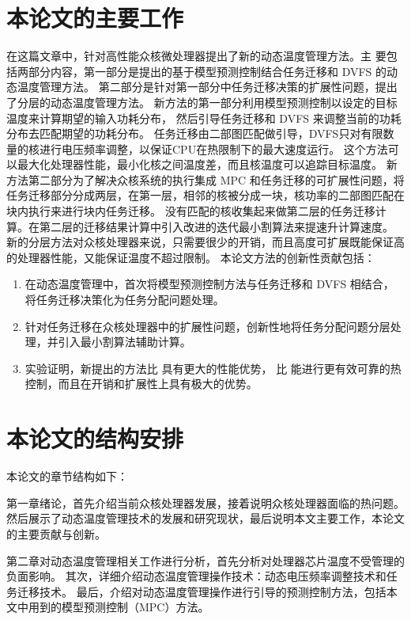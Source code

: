  \section{本论文的主要工作}\label{sec:thispaper}
在这篇文章中，针对高性能众核微处理器提出了新的动态温度管理方法。主
要包括两部分内容，第一部分是提出的基于模型预测控制结合任务迁移和 DVFS 的动态温度管理方法。
第二部分是针对第一部分中任务迁移决策的扩展性问题，提出了分层的动态温度管理方法。
新方法的第一部分利用模型预测控制以设定的目标温度来计算期望的输入功耗分布，
然后引导任务迁移和 DVFS 来调整当前的功耗分布去匹配期望的功耗分布。
任务迁移由二部图匹配做引导，DVFS只对有限数量的核进行电压频率调整，以保证CPU在热限制下的最大速度运行。
这个方法可以最大化处理器性能，最小化核之间温度差，而且核温度可以追踪目标温度。
新方法第二部分为了解决众核系统的执行集成 MPC 和任务迁移的可扩展性问题，将任务迁移部分分成两层，在第一层，相邻的核被分成一块，核功率的二部图匹配在块内执行来进行块内任务迁移。
没有匹配的核收集起来做第二层的任务迁移计算。在第二层的迁移结果计算中引入改进的迭代最小割算法来提速升计算速度。
新的分层方法对众核处理器来说，只需要很少的开销，而且高度可扩展既能保证高的处理器性能，又能保证温度不超过限制。
本论文方法的创新性贡献包括：
\begin{enumerate}
\item 在动态温度管理中，首次将模型预测控制方法与任务迁移和 DVFS 相结合，将任务迁移决策化为任务分配问题处理。
\item 针对任务迁移在众核处理器中的扩展性问题，创新性地将任务分配问题分层处理，并引入最小割算法辅助计算。
\item 实验证明，新提出的方法比 \cite{Zanini:ECCTD'09} 具有更大的性能优势，
      比 \cite{Hanumaiah:TCAD'11} 能进行更有效可靠的热控制，而且在开销和扩展性上具有极大的优势。
\end{enumerate}

 \section{本论文的结构安排}\label{sec:sec}
本论文的章节结构如下：

第一章绪论，首先介绍当前众核处理器发展，接着说明众核处理器面临的热问题。
然后展示了动态温度管理技术的发展和研究现状，最后说明本文主要工作，本论文的主要贡献与创新。

第二章对动态温度管理相关工作进行分析，首先分析对处理器芯片温度不受管理的负面影响。
其次，详细介绍动态温度管理操作技术：动态电压频率调整技术和任务迁移技术。
最后，介绍对动态温度管理操作进行引导的预测控制方法，包括本文中用到的模型预测控制（MPC）方法。

